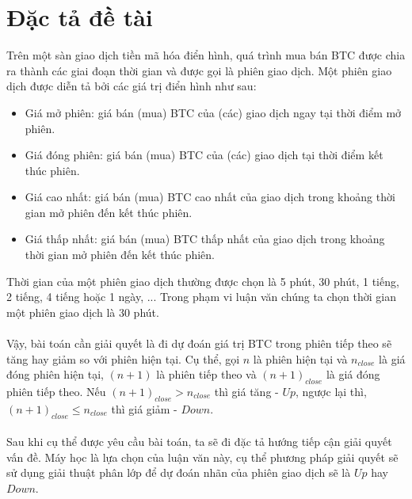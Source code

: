 \section{Đặc tả đề tài}
Trên một sàn giao dịch tiền mã hóa điển hình, quá trình mua bán BTC được chia ra 
thành các giai đoạn thời gian và được gọi là phiên giao dịch. Một phiên giao dịch 
được diễn tả bởi các giá trị điển hình như sau:
\begin{itemize}
\item Giá mở phiên: giá bán (mua) BTC của (các) giao dịch ngay tại thời 
điểm mở phiên.
\item Giá đóng phiên: giá bán (mua) BTC của (các) giao dịch tại thời điểm 
kết thúc phiên.
\item Giá cao nhất: giá bán (mua) BTC cao nhất của giao dịch trong khoảng 
thời gian mở phiên đến kết thúc phiên.
\item Giá thấp nhất: giá bán (mua) BTC thấp nhất của giao dịch trong khoảng 
thời gian mở phiên đến kết thúc phiên.
\end{itemize}
Thời gian của một phiên giao dịch thường được chọn là 5 phút, 30 phút, 1 tiếng, 2 tiếng, 
4 tiếng hoặc 1 ngày, ... 
Trong phạm vi luận văn chúng ta chọn thời gian một phiên giao dịch là 30 phút.\\\\
Vậy, bài toán cần giải quyết là đi dự đoán giá trị BTC trong phiên tiếp theo sẽ tăng 
hay giảm so với phiên hiện tại. Cụ thể, gọi $n$ là phiên hiện tại và $n_{close}$ 
là giá đóng phiên hiện tại, $(n+1)$ là phiên tiếp theo và $(n+1)_{close}$ là giá đóng 
phiên tiếp theo. Nếu $(n+1)_{close} > n_{close}$ thì giá tăng - $Up$, ngược lại thì, 
$(n+1)_{close} \leq n_{close}$ thì giá giảm - $Down$.\\\\
Sau khi cụ thể được yêu cầu bài toán, ta sẽ đi đặc tả hướng tiếp cận giải quyết 
vấn đề. Máy học là lựa chọn của luận văn này, cụ thể phương pháp giải quyết 
sẽ sử dụng giải thuật phân lớp để dự đoán nhãn của phiên giao dịch sẽ là $Up$ 
hay $Down$.


